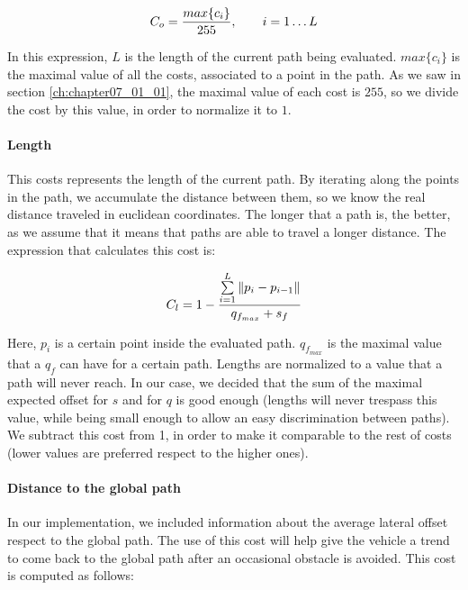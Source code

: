 \begin{equation}\label{eq:cp07_occlusion_cost}
C_o = {{max\{c_i\}} \over 255}, ~~~~~~ i=1 \dots L
\end{equation}

In this expression, $L$ is the length of the current path being evaluated. $max\{c_i\}$ is the maximal value of all the costs, associated to a point in the path. As we saw in section \ref{ch:chapter07_01_01}, the maximal value of each cost is $255$, so we divide the cost by this value, in order to normalize it to $1$.

\paragraph{Length}\label{ch:chapter07_01_04_00_02}

This costs represents the length of the current path. By iterating along the points in the path, we accumulate the distance between them, so we know the real distance traveled in euclidean coordinates. The longer that a path is, the better, as we assume that it means that paths are able to travel a longer distance. The expression that calculates this cost is:

\begin{equation}\label{eq:cp07_length_cost}
C_l = 1- {{\sum\limits_{i=1}^{L}\|p_i - p_{i - 1}\|} \over {q_{f_{max}} + s_f}}
\end{equation}

Here, $p_i$ is a certain point inside the evaluated path. $q_{f_{max}}$ is the maximal value that a $q_f$ can have for a certain path. Lengths are normalized to a value that a path will never reach. In our case, we decided that the sum of the maximal expected offset for $s$ and for $q$ is good enough (lengths will never trespass this value, while being small enough to allow an easy discrimination between paths). We subtract this cost from 1, in order to make it comparable to the rest of costs (lower values are preferred respect to the higher ones).

\paragraph{Distance to the global path}\label{ch:chapter07_01_04_00_03}

In our implementation, we included information about the average lateral offset respect to the global path. The use of this cost will help give the vehicle a trend to  come back to the global path after an occasional obstacle is avoided. This cost is computed as follows:

